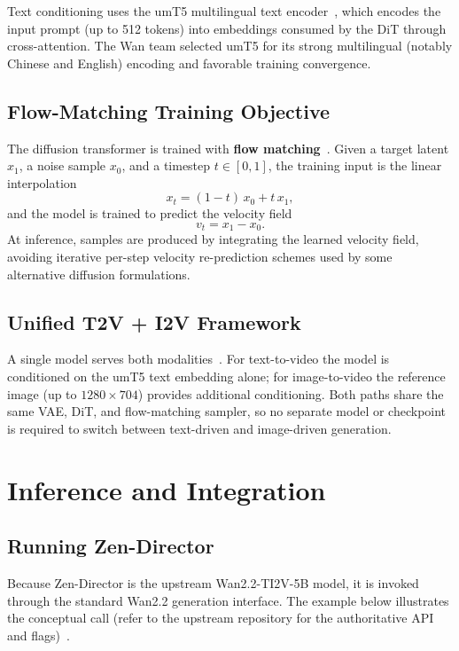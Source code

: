 \documentclass[11pt,a4paper]{article}
\begin{document}
Text conditioning uses the umT5 multilingual text encoder~\cite{wan21paper}, which encodes the
input prompt (up to 512 tokens) into embeddings consumed by the DiT through cross-attention.
The Wan team selected umT5 for its strong multilingual (notably Chinese and English) encoding
and favorable training convergence.

\subsection{Flow-Matching Training Objective}

The diffusion transformer is trained with \textbf{flow matching}~\cite{wan21paper}. Given a
target latent $x_1$, a noise sample $x_0$, and a timestep $t \in [0,1]$, the training input is
the linear interpolation
\begin{equation}
    x_t = (1-t)\,x_0 + t\,x_1 ,
\end{equation}
and the model is trained to predict the velocity field
\begin{equation}
    v_t = x_1 - x_0 .
\end{equation}
At inference, samples are produced by integrating the learned velocity field, avoiding iterative
per-step velocity re-prediction schemes used by some alternative diffusion formulations.

\subsection{Unified T2V + I2V Framework}

A single model serves both modalities~\cite{wan22hf,wan22github}. For text-to-video the model is
conditioned on the umT5 text embedding alone; for image-to-video the reference image (up to
$1280\times704$) provides additional conditioning. Both paths share the same VAE, DiT, and
flow-matching sampler, so no separate model or checkpoint is required to switch between
text-driven and image-driven generation.

\section{Inference and Integration}

\subsection{Running Zen-Director}

Because Zen-Director is the upstream Wan2.2-TI2V-5B model, it is invoked through the standard
Wan2.2 generation interface. The example below illustrates the conceptual call (refer to the
upstream repository for the authoritative API and flags)~\cite{wan22github}.
\end{document}
